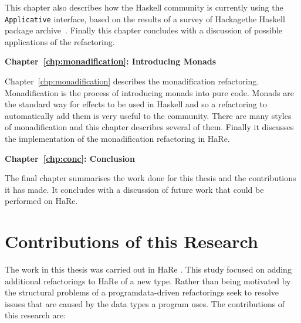 This chapter also describes how the Haskell community is currently using the \texttt{Applicative} interface, based on the results of a survey of Hackage\DIFaddbegin \DIFadd{, }\DIFaddend the Haskell package archive~\citep{hackage}. Finally this chapter concludes with a discussion of possible applications of the refactoring.

\textbf{Chapter~\ref{chp:monadification}: Introducing Monads} 

Chapter~\ref{chp:monadification} describes the monadification refactoring. Monadification is the process of introducing monads into pure code. Monads are the standard way for effects to be used in Haskell and so a refactoring to automatically add them is very useful to the community. There are many styles of monadification and this chapter describes several of them. Finally it discusses the implementation of the monadification refactoring in HaRe.

\DIFdelbegin \textbf{}


\DIFdelend \textbf{Chapter~\ref{chp:conc}: Conclusion}

The final chapter summarises the work done for this thesis and the contributions it has made. It concludes with a discussion of future work that could be performed on HaRe.

\section{Contributions of this Research}

The work in this thesis was carried out in HaRe\DIFdelbegin {}\textbf{}%
\textbf{}%
\DIFdelend . This study focused on adding additional refactorings to HaRe of a new type. Rather than being motivated by the structural problems of a program\DIFaddbegin \DIFadd{, }\DIFaddend data-driven refactorings seek to resolve issues that are caused by the data types a program uses. The contributions of this research are:

